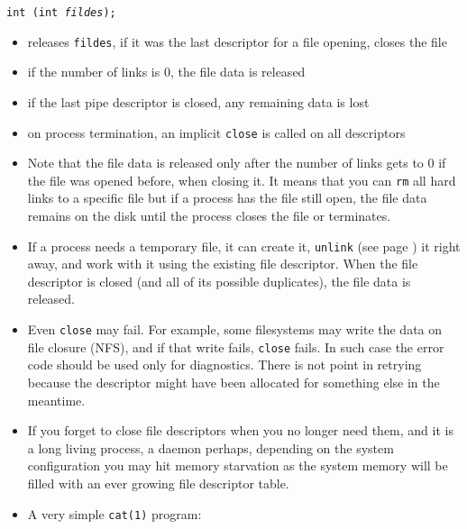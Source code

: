 

\begin{slide}
\texttt{int (int \emph{fildes});}
\begin{itemize}
\item releases \texttt{fildes}, if it was the last descriptor for a file
opening, closes the file
\item if the number of links is 0, the file data is released
\item if the last pipe descriptor is closed, any remaining data is lost
\item on process termination, an implicit \texttt{close} is called on all
descriptors
\end{itemize}
\end{slide}

\begin{itemize}
\item Note that the file data is released only after the number of links gets to
0  if the file was opened before, when closing it.  It means that you
can \texttt{rm} all hard links to a specific file but if a process has the file
still open, the file data remains on the disk until the process closes the file
or terminates.
\item If a process needs a temporary file, it can create it, \texttt{unlink}
(see page \pageref{UNLINK}) it right away, and work with it using the existing
file descriptor.  When the file descriptor is closed (and all of its possible
duplicates), the file data is released.
\item Even \texttt{close} may fail.  For example, some filesystems may write the
data on file closure (NFS), and if that write fails, \texttt{close} fails.
In such case the error code should be used only for diagnostics. There is not
point in retrying because the descriptor might have been allocated for something
else in the meantime.
\item If you forget to close file descriptors when you no longer need them,
and it is a long living process, a daemon perhaps, depending on the system
configuration you may hit memory starvation as the system memory will be filled
with an ever growing file descriptor table.
\item {} A very simple \texttt{cat(1)} program:
\end{itemize}

